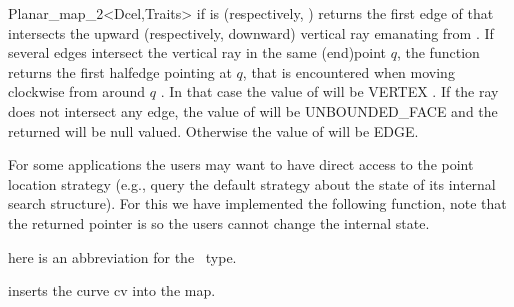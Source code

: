 \begin{ccRefClass}{Planar_map_2<Dcel,Traits>}
 {if
    is  (respectively,
   ) returns the first edge of  that
   intersects the upward (respectively, downward) vertical ray emanating
   from . If several edges intersect the vertical ray
   in the same (end)point $q$, the function returns the
   first halfedge pointing at $q$, that is encountered when moving clockwise 
   from  around $q$ . 
   In that case the value of  will
   be VERTEX . If the ray does not intersect any edge, the value 
   of  
   will be UNBOUNDED\_FACE and the 
   returned will be null
   valued. Otherwise the value of  will be EDGE.
    } 

\begin{ccAdvanced}
    For some applications the users may want to have direct access to
    the point location strategy (e.g., query the default strategy about
    the state of its internal search structure). For this we have implemented 
    the following function, note that the returned pointer is  so
    the users cannot change the internal state.


 here is an abbreviation for the \ccRefName\ type.
\end{ccAdvanced}

\ccModifiers

 {inserts the curve
   cv into the map.
   }                

\begin{ccAdvanced}



\end{ccAdvanced}
\end{ccRefClass}
